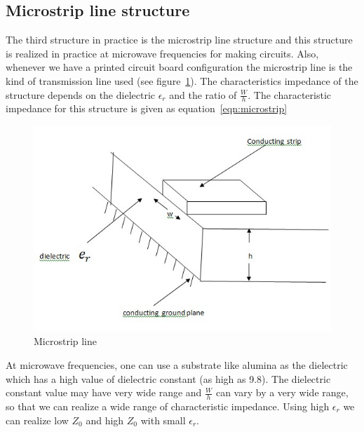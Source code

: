 \subsection{Microstrip line structure}
The third structure in practice is the microstrip line structure and this structure is realized in practice at microwave frequencies for making circuits. Also, whenever we have a printed circuit board configuration the microstrip line is the kind of transmission line used (see figure~\ref{fig:microstrip}). The characteristics impedance of the structure depends on the dielectric $\epsilon_{r}$ and the ratio of $\frac{W}{h}$. The characteristic impedance for this structure is given as equation~\ref{eqn:microstrip}
\begin{figure}[h]
\centering
\includegraphics[width=1\linewidth]{./graphics/microstrip}
\caption{Microstrip line}
\label{fig:microstrip}
\end{figure}

At microwave frequencies, one can use a substrate like alumina as the dielectric which has a high value of dielectric constant (as high as 9.8). The dielectric constant value may have very wide range and $\frac{W}{h}$ can vary by a very wide range, so that we can realize a wide range of characteristic impedance. Using high $\epsilon_r$ we can realize low $Z_0$ and high $Z_0$ with small $\epsilon_r$.


